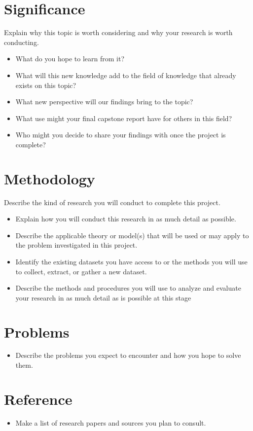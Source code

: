 \documentclass{article}
\begin{document}
\section*{Significance}

Explain why this topic is worth considering and why your research is worth conducting.

    \begin{itemize}
        \item[--] What do you hope to learn from it? 
        \item[--] What will this new knowledge add to the field of knowledge that already exists on this topic?
        \item[--] What new perspective will our findings bring to the topic?
        \item[--] What use might your final capstone report have for others in this field? 
        \item[--] Who might you decide to share your findings with once the project is complete?
    \end{itemize}

\section*{Methodology}

Describe the kind of research you will conduct to complete this project.

\begin{itemize}
    \item[--] Explain how you will conduct this research in as much detail as possible.
    \item[--] Describe the applicable theory or model(s) that will be used or may apply to the problem investigated in this project. 
    \item[--] Identify the existing datasets you have access to or the methods you will use to collect, extract, or gather a new dataset.
    \item[--] Describe the methods and procedures you will use to analyze and evaluate your research in as much detail as is possible at this stage
    
\end{itemize}

\section*{Problems}
\begin{itemize}
    \item[--] Describe the problems you expect to encounter and how you hope to solve them.
\end{itemize}

\section*{Reference}
\begin{itemize}
    \item[--] Make a list of research papers and sources you plan to consult. 
\end{itemize}

%
%
\end{document}
